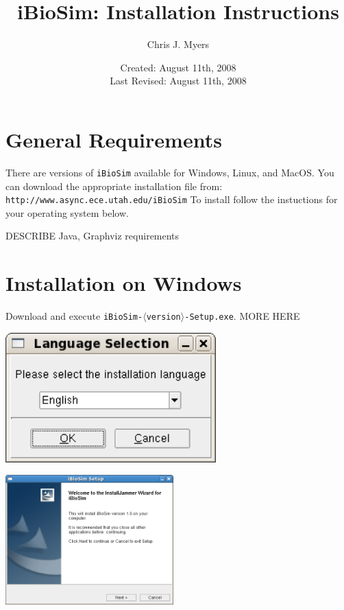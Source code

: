 \documentclass[titlepage,11pt]{article}
\title{iBioSim: Installation Instructions}
\author{Chris J. Myers}
\date{Created: August 11th, 2008\\
  Last Revised: August 11th, 2008
}
\begin{document}
\maketitle

  
\tableofcontents

\clearpage
  

\section{General Requirements}

\noindent
There are versions of {\tt iBioSim} available for Windows, Linux, and
MacOS.  You can download the appropriate installation file from:\\
{\tt http://www.async.ece.utah.edu/iBioSim}
To install follow the instuctions for your operating system below.

DESCRIBE Java, Graphviz requirements

\section{Installation on Windows}

\noindent
Download and execute {\tt iBioSim-$\langle$version$\rangle$-Setup.exe}.
MORE HERE

\includegraphics[height=50mm]{screenshots/language}

\includegraphics[height=50mm]{screenshots/setup}
\end{document}
